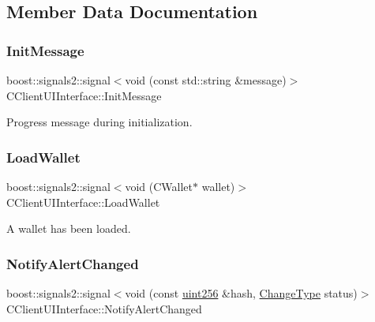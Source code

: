 \subsection{Member Data Documentation}
\mbox{\label{class_c_client_u_i_interface_abc63cc3f3e5e15632f713d859dbc6bc2}} 
\subsubsection{\texorpdfstring{Init\+Message}{InitMessage}}
{\footnotesize\ttfamily boost\+::signals2\+::signal$<$void (const std\+::string \&message)$>$ C\+Client\+U\+I\+Interface\+::\+Init\+Message}

Progress message during initialization. \mbox{\label{class_c_client_u_i_interface_a32a8930a5b69dd92e25fa474bd6e5420}} 
\subsubsection{\texorpdfstring{Load\+Wallet}{LoadWallet}}
{\footnotesize\ttfamily boost\+::signals2\+::signal$<$void (C\+Wallet$\ast$ wallet)$>$ C\+Client\+U\+I\+Interface\+::\+Load\+Wallet}

A wallet has been loaded. \mbox{\label{class_c_client_u_i_interface_a2c42ebdda06512513445cd86881b157a}} 
\subsubsection{\texorpdfstring{Notify\+Alert\+Changed}{NotifyAlertChanged}}
{\footnotesize\ttfamily boost\+::signals2\+::signal$<$void (const \mbox{\hyperlink{classuint256}{uint256}} \&hash, \mbox{\hyperlink{ui__interface_8h_a293ba931937e469a6327b8d6b4872969}{Change\+Type}} status)$>$ C\+Client\+U\+I\+Interface\+::\+Notify\+Alert\+Changed}

